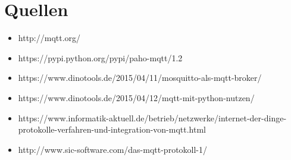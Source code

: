 \pagebreak
\section{Quellen}
\begin{itemize}
\item http://mqtt.org/
\item https://pypi.python.org/pypi/paho-mqtt/1.2
\item https://www.dinotools.de/2015/04/11/mosquitto-als-mqtt-broker/
\item https://www.dinotools.de/2015/04/12/mqtt-mit-python-nutzen/
\item https://www.informatik-aktuell.de/betrieb/netzwerke/internet-der-dinge-protokolle-verfahren-und-integration-von-mqtt.html
\item http://www.sic-software.com/das-mqtt-protokoll-1/
\end{itemize}
	
